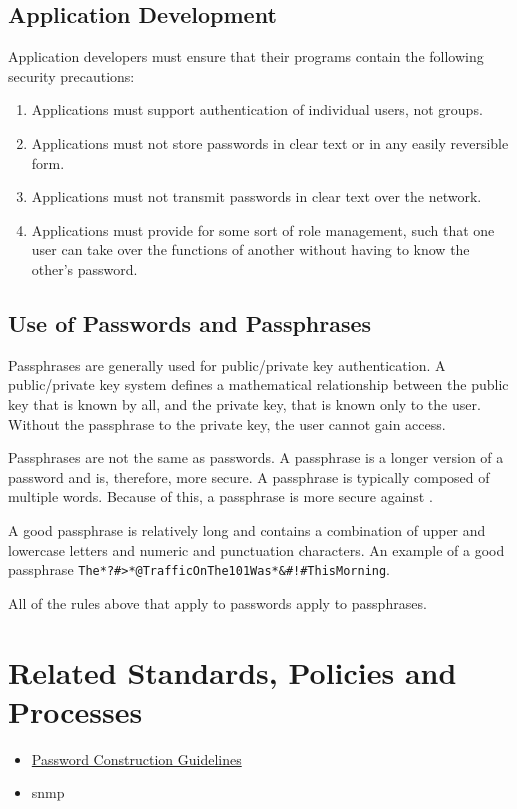 \subsection{Application Development}
Application developers must ensure that their programs contain the following security precautions:
\begin{enumerate}
\item
Applications must support authentication of individual users, not groups.
\item
Applications must not store passwords in clear text or in any easily reversible form.
\item
Applications must not transmit passwords in clear text over the network.
\item
Applications must provide for some sort of role management, such that one user can take over the functions of another without having to know the other's password.
\end{enumerate}
\subsection{Use of Passwords and Passphrases}
Passphrases are generally used for public/private key authentication.  
A public/private key system defines a mathematical relationship between the public key that is known by all, and the private key, that is known only to the user.  
Without the passphrase to  the private key, the user cannot gain access.

Passphrases are not the same as passwords.  
A passphrase is a longer version of a password and is, therefore, more secure.  
A passphrase is typically composed of multiple words.  
Because of this, a passphrase is more secure against .

A good passphrase is relatively long and contains a combination of upper and lowercase letters and numeric and punctuation characters.  
An example of a good passphrase \verb"The*?#>*@TrafficOnThe101Was*&#!#ThisMorning".

All of the rules above that apply to passwords apply to passphrases.
\CommonPolicyCompliance

\section{Related Standards, Policies\oxford{} and Processes}
\begin{itemize}
\item \hyperref[G:PCG]{Password Construction Guidelines}
\end{itemize}
\CommonDefinitionsAndTerms
\begin{itemize}
\item \acrfull{snmp}
\end{itemize}
\CommonRevisionHistory
